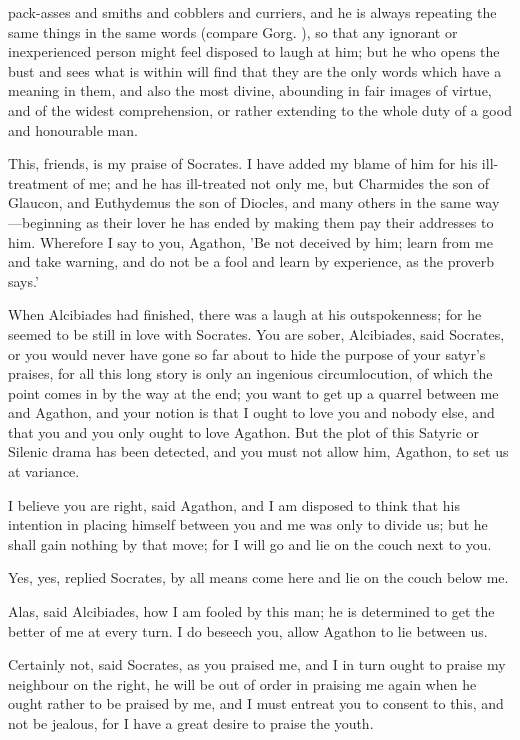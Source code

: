 \documentclass[11pt,letter]{article}
\begin{document}
pack-asses and smiths and cobblers and curriers, and he is always repeating the same things in the same words (compare Gorg. ), so that any ignorant or inexperienced person might feel disposed to laugh at him; but he who opens the bust and sees what is within will find that they are the only words which have a meaning in them, and also the most divine, abounding in fair images of virtue, and of the widest comprehension, or rather extending to the whole duty of a good and honourable man.

\par  This, friends, is my praise of Socrates. I have added my blame of him for his ill-treatment of me; and he has ill-treated not only me, but Charmides the son of Glaucon, and Euthydemus the son of Diocles, and many others in the same way—beginning as their lover he has ended by making them pay their addresses to him. Wherefore I say to you, Agathon, 'Be not deceived by him; learn from me and take warning, and do not be a fool and learn by experience, as the proverb says.'

\par  When Alcibiades had finished, there was a laugh at his outspokenness; for he seemed to be still in love with Socrates. You are sober, Alcibiades, said Socrates, or you would never have gone so far about to hide the purpose of your satyr's praises, for all this long story is only an ingenious circumlocution, of which the point comes in by the way at the end; you want to get up a quarrel between me and Agathon, and your notion is that I ought to love you and nobody else, and that you and you only ought to love Agathon. But the plot of this Satyric or Silenic drama has been detected, and you must not allow him, Agathon, to set us at variance.

\par  I believe you are right, said Agathon, and I am disposed to think that his intention in placing himself between you and me was only to divide us; but he shall gain nothing by that move; for I will go and lie on the couch next to you.

\par  Yes, yes, replied Socrates, by all means come here and lie on the couch below me.

\par  Alas, said Alcibiades, how I am fooled by this man; he is determined to get the better of me at every turn. I do beseech you, allow Agathon to lie between us.

\par  Certainly not, said Socrates, as you praised me, and I in turn ought to praise my neighbour on the right, he will be out of order in praising me again when he ought rather to be praised by me, and I must entreat you to consent to this, and not be jealous, for I have a great desire to praise the youth.
\end{document}
